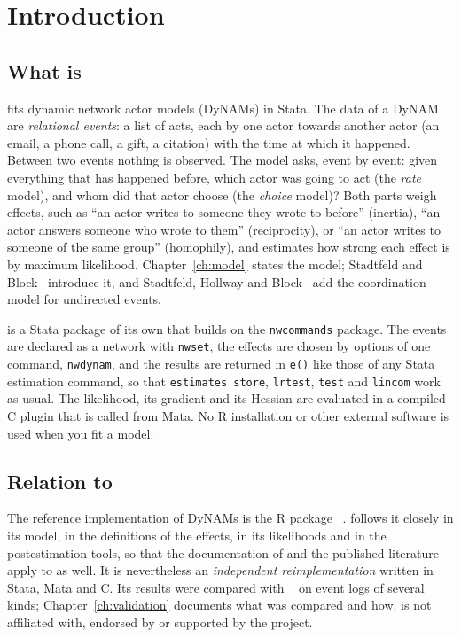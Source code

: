 \chapter{Introduction}\label{ch:intro}

\section{What \texorpdfstring{\nwdynam}{nwdynam} is}

\nwdynam{} fits dynamic network actor models (DyNAMs) in Stata. The data of a DyNAM are \emph{relational events}: a list of acts, each by one actor towards another actor (an email, a phone call, a gift, a citation) with the time at which it happened. Between two events nothing is observed. The model asks, event by event: given everything that has happened before, which actor was going to act (the \emph{rate} model), and whom did that actor choose (the \emph{choice} model)? Both parts weigh effects, such as ``an actor writes to someone they wrote to before'' (inertia), ``an actor answers someone who wrote to them'' (reciprocity), or ``an actor writes to someone of the same group'' (homophily), and \nwdynam{} estimates how strong each effect is by maximum likelihood. Chapter~\ref{ch:model} states the model; Stadtfeld and Block~\cite{stadtfeld2017b} introduce it, and Stadtfeld, Hollway and Block~\cite{stadtfeld2017h} add the coordination model for undirected events.

\nwdynam{} is a Stata package of its own that builds on the \texttt{nwcommands} package. The events are declared as a network with \texttt{nwset}, the effects are chosen by options of one command, \texttt{nwdynam}, and the results are returned in \texttt{e()} like those of any Stata estimation command, so that \texttt{estimates store}, \texttt{lrtest}, \texttt{test} and \texttt{lincom} work as usual. The likelihood, its gradient and its Hessian are evaluated in a compiled C plugin that is called from Mata. No R installation or other external software is used when you fit a model.

\section{Relation to \texorpdfstring{\goldfish}{goldfish}}

The reference implementation of DyNAMs is the R package \goldfish{}~\cite{goldfish}. \nwdynam{} follows it closely in its model, in the definitions of the effects, in its likelihoods and in the postestimation tools, so that the documentation of \goldfish{} and the published literature apply to \nwdynam{} as well. It is nevertheless an \emph{independent reimplementation} written in Stata, Mata and C. Its results were compared with \goldfish{}~\gfver{} on event logs of several kinds; Chapter~\ref{ch:validation} documents what was compared and how. \nwdynam{} is not affiliated with, endorsed by or supported by the \goldfish{} project.

